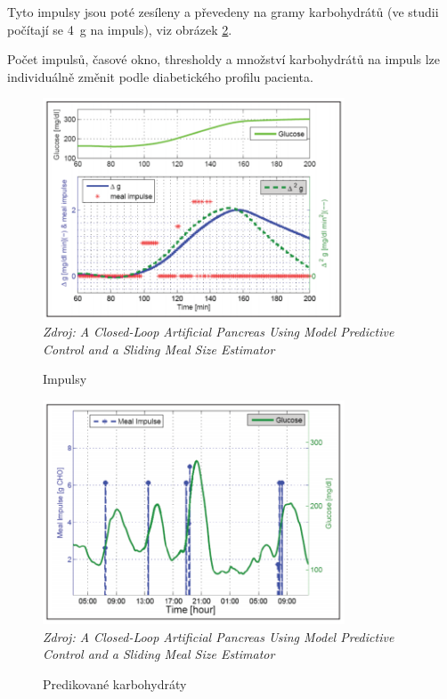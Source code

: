 Tyto impulsy jsou poté zesíleny a převedeny na gramy karbohydrátů (ve studii počítají se 4~g na impuls), viz obrázek \ref{fig:analyza:threshold2}.

Počet impulsů, časové okno, thresholdy a množství karbohydrátů na impuls lze individuálně změnit podle diabetického profilu pacienta.

\begin{figure}[H]
\caption{Impulsy}
\label{fig:analyza:threshold1}
\centering
\includegraphics[width=0.8\textwidth]{img/analyzaCHO/threshold1.png}\\
\textit{Zdroj: A Closed-Loop Artificial Pancreas Using Model Predictive Control and a Sliding Meal Size Estimator \citep{analyzaCHO.Thresholds}}
\end{figure}
\begin{figure}[H]
\caption{Predikované karbohydráty}
\label{fig:analyza:threshold2}
\centering
\includegraphics[width=0.8\textwidth]{img/analyzaCHO/threshold2.png}\\
\textit{Zdroj: A Closed-Loop Artificial Pancreas Using Model Predictive Control and a Sliding Meal Size Estimator \citep{analyzaCHO.Thresholds}}
\end{figure}

